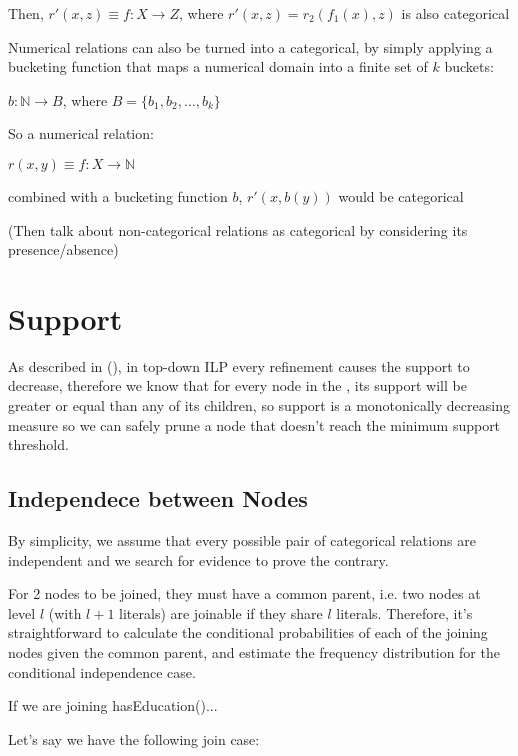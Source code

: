 Then, $r'(x,z) \equiv f : X \rightarrow Z$, where $r'(x,z)=r_2(f_1(x),z)$ is also categorical


Numerical relations can also be turned into a categorical, by simply applying a bucketing function that maps a numerical domain into a finite set of $k$ buckets:

$b: \mathbb{N} \rightarrow B$, where $B=\{b_1,b_2,\dots ,b_k \}$

So a numerical relation:

$r(x,y) \equiv f : X \rightarrow \mathbb{N}$ 

combined with a bucketing function $b$, $r'(x,b(y))$ would be categorical

(Then talk about non-categorical relations as categorical by considering its presence/absence)

\section{Support}

As described in (\cite{LavracDz94}), in top-down ILP every refinement causes the support to decrease, therefore we know that for every node in the \graphname, its support will be greater or equal than any of its children, so support is a monotonically decreasing measure so we can safely prune a node that doesn't reach the minimum support threshold.


\subsection{Independece between Nodes}

By simplicity, we assume that every possible pair of categorical relations are independent and we search for evidence to prove the contrary.

For 2 nodes to be joined, they must have a common parent, i.e. two nodes at level $l$ (with $l+1$ literals) are joinable if they share $l$ literals. Therefore, it's straightforward to calculate the conditional probabilities of each of the joining nodes given the common parent, and estimate the frequency distribution for the conditional independence case.

If we are joining hasEducation()...

Let's say we have the following join case:
 
